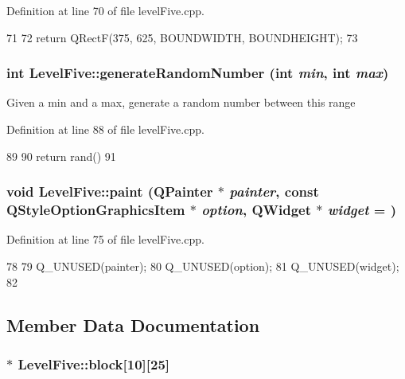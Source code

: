 Definition at line 70 of file levelFive.cpp.


\begin{DoxyCode}
71 {
72     return QRectF(375, 625, BOUNDWIDTH, BOUNDHEIGHT);
73 }
\end{DoxyCode}
\hypertarget{class_level_five_a15a3c882b6f2c4f645cd627e72cd7410}{
\subsubsection[{generateRandomNumber}]{\setlength{\rightskip}{0pt plus 5cm}int LevelFive::generateRandomNumber (int {\em min}, \/  int {\em max})}}
\label{class_level_five_a15a3c882b6f2c4f645cd627e72cd7410}
Given a min and a max, generate a random number between this range 

Definition at line 88 of file levelFive.cpp.


\begin{DoxyCode}
89 {
90     return rand() %
91 }
\end{DoxyCode}
\hypertarget{class_level_five_a128669075332c352f423e6e7892c9370}{
\subsubsection[{paint}]{\setlength{\rightskip}{0pt plus 5cm}void LevelFive::paint (QPainter $\ast$ {\em painter}, \/  const QStyleOptionGraphicsItem $\ast$ {\em option}, \/  QWidget $\ast$ {\em widget} = {})}}
\label{class_level_five_a128669075332c352f423e6e7892c9370}


Definition at line 75 of file levelFive.cpp.


\begin{DoxyCode}
78 {
79     Q_UNUSED(painter);
80     Q_UNUSED(option);
81     Q_UNUSED(widget);
82 }
\end{DoxyCode}


\subsection{Member Data Documentation}
\hypertarget{class_level_five_acb6899f56afdf5b54ee0b078114dccdb}{
\subsubsection[{block}]{$\ast$ {\bf LevelFive::block}\mbox{[}10\mbox{]}\mbox{[}25\mbox{]}}}
\label{class_level_five_acb6899f56afdf5b54ee0b078114dccdb}


